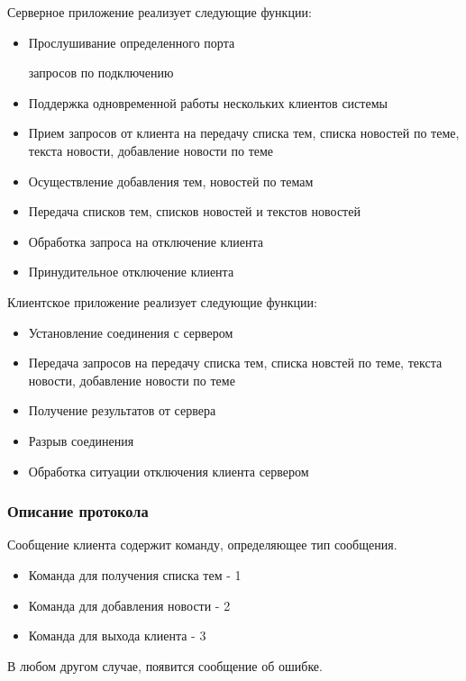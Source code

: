 Серверное приложение реализует следующие функции:
\begin{itemize}
\item Прослушивание определенного порта

 запросов по подключению

\item Поддержка одновременной работы нескольких клиентов системы

\item Прием запросов от клиента на передачу списка тем, списка новостей по теме, текста новости, добавление новости по теме

\item Осуществление добавления тем, новостей по темам

\item Передача списков тем, списков новостей и текстов новостей

\item Обработка запроса на отключение клиента

\item Принудительное отключение клиента
\end{itemize}

Клиентское приложение реализует следующие функции:

\begin{itemize}
\item Установление соединения с сервером

\item Передача запросов на передачу списка тем, списка новстей по теме, текста новости, добавление новости по теме

\item Получение результатов от сервера

\item Разрыв соединения

\item Обработка ситуации отключения клиента сервером
\end{itemize}


\subsubsection{Описание протокола}
Сообщение клиента  содержит команду, определяющее тип сообщения. 
\begin{itemize}
\item Команда для получения списка тем - 1
\item Команда для добавления новости - 2
\item Команда для выхода клиента - 3
\end{itemize}
В любом другом случае, появится сообщение об ошибке.\\

